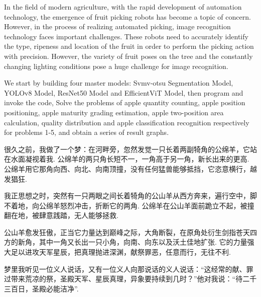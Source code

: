 \documentclass{article}
\newcommand{\qipao}{\CJKfamily{Custom}}
\begin{document}
\qipao\xiangsu

In the field of modern agriculture, with the rapid development of automation technology, the emergence of fruit picking robots has become a topic of concern. However, in the process of realizing automated picking, image recognition technology faces important challenges. These robots need to accurately identify the type, ripeness and location of the fruit in order to perform the picking action with precision. However, the variety of fruit poses on the tree and the constantly changing lighting conditions pose a huge challenge for image recognition.

{\xishou We start by building four master models: Svmv-otsu Segmentation Model, YOLOv8 Model, ResNet50 Model and EfficientViT Model, then program and invoke the code, Solve the problems of apple quantity counting, apple position positioning, apple maturity grading estimation, apple two-position area calculation, quality distribution and apple classification recognition respectively for problems 1-5, and obtain a series of result graphs.}

很久之前，我做了一个梦：在河畔旁，忽然发觉一只长着两副犄角的公绵羊，它站在水面凝视着我. 公绵羊的两只角长短不一，一角高于另一角，新长出来的更高. 公绵羊用它那角向西、向北、向南顶撞，没有任何猛兽能够抵挡，它恣意横行，越发猖狂.

我正思想之时，突然有一只两眼之间长着犄角的公山羊从西方奔来，遍行空中，脚不着地，向公绵羊怒烈冲击，折断它的两角. 公绵羊在公山羊面前跪立不起，被撞翻在地，被肆意践踏，无人能够拯救.

公山羊愈发狂傲，正当它力量达到巅峰之际，大角断裂，在原角处衍生剑指苍天四方的新角，其中一角又长出一只小角，向南、向东以及沃土佳地扩张. 它的力量强大足以进攻天军星辰，把真理抛进深渊，献祭罪恶，任意而行，无往不利.

梦里我听见一位义人说话，又有一位义人向那说话的义人说话：“这经常的献、罪过带来荒凉的祭，圣殿天军、星辰真理，异象要持续到几时？”他对我说：“待二千三百日，圣殿必能洁净”.
\end{document}
